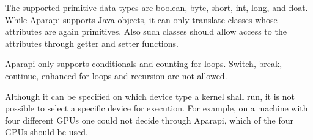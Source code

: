 \begin{description}[style=nextline]
  \item [Data Types]
  The supported primitive data types are boolean, byte, short, int, long, and float. While Aparapi supports Java objects, it can only translate classes whose attributes are again primitives. Also such classes should allow access to the attributes through getter and setter functions.

  \item [Control Flow]
  Aparapi only supports conditionals and counting for-loops. Switch, break, continue, enhanced for-loops and recursion are not allowed.

  \item [Specific Device Choice]
  Although it can be specified on which device type a kernel shall run, it is not possible to select a specific device for execution. For example, on a machine with four different GPUs one could not decide through Aparapi, which of the four GPUs should be used.
\end{description}

